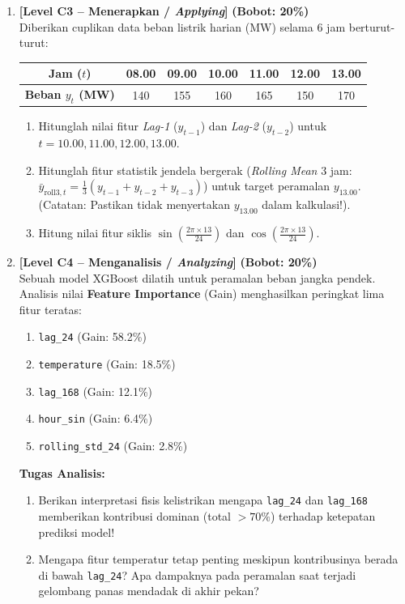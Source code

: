 \documentclass[11pt,a4paper]{article}
\begin{document}
\begin{enumerate}[leftmargin=1.5em, label=\textbf{Soal \arabic*.}]
    \item \textbf{[Level C3 -- Menerapkan / \textit{Applying}]} \hfill \textbf{(Bobot: 20\%)} \\
    Diberikan cuplikan data beban listrik harian (MW) selama 6 jam berturut-turut:
    \begin{center}
    \begin{tabular}{|c|c|c|c|c|c|c|}
    \hline
    \rowcolor{boxbg}
    \textbf{Jam ($t$)} & 08.00 & 09.00 & 10.00 & 11.00 & 12.00 & 13.00 \\ \hline
    \textbf{Beban $y_t$ (MW)} & 140 & 155 & 160 & 165 & 150 & 170 \\ \hline
    \end{tabular}
    \end{center}
    \begin{enumerate}[label=\alph*.]
        \item Hitunglah nilai fitur \textit{Lag-1} ($y_{t-1}$) dan \textit{Lag-2} ($y_{t-2}$) untuk $t = 10.00, 11.00, 12.00, 13.00$.
        \item Hitunglah fitur statistik jendela bergerak (\textit{Rolling Mean} 3 jam: $\bar{y}_{\text{roll3}, t} = \frac{1}{3}(y_{t-1} + y_{t-2} + y_{t-3})$) untuk target peramalan $y_{13.00}$. (Catatan: Pastikan tidak menyertakan $y_{13.00}$ dalam kalkulasi!).
        \item Hitung nilai fitur siklis $\sin\left(\frac{2\pi \times 13}{24}\right)$ dan $\cos\left(\frac{2\pi \times 13}{24}\right)$.
    \end{enumerate}

    \newpage

    \item \textbf{[Level C4 -- Menganalisis / \textit{Analyzing}]} \hfill \textbf{(Bobot: 20\%)} \\
    Sebuah model XGBoost dilatih untuk peramalan beban jangka pendek. Analisis nilai \textbf{Feature Importance} (Gain) menghasilkan peringkat lima fitur teratas:
    \begin{enumerate}
        \item \texttt{lag\_24} (Gain: 58.2\%)
        \item \texttt{temperature} (Gain: 18.5\%)
        \item \texttt{lag\_168} (Gain: 12.1\%)
        \item \texttt{hour\_sin} (Gain: 6.4\%)
        \item \texttt{rolling\_std\_24} (Gain: 2.8\%)
    \end{enumerate}
    \textbf{Tugas Analisis:}
    \begin{enumerate}[label=\alph*.]
        \item Berikan interpretasi fisis kelistrikan mengapa \texttt{lag\_24} dan \texttt{lag\_168} memberikan kontribusi dominan (total $>70\%$) terhadap ketepatan prediksi model!
        \item Mengapa fitur temperatur tetap penting meskipun kontribusinya berada di bawah \texttt{lag\_24}? Apa dampaknya pada peramalan saat terjadi gelombang panas mendadak di akhir pekan?
    \end{enumerate}


\end{enumerate}
\end{document}
